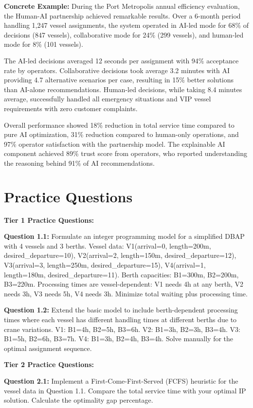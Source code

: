 \documentclass{article}
\begin{document}
\textbf{Concrete Example:} During the Port Metropolis annual efficiency evaluation, the Human-AI partnership achieved remarkable results. Over a 6-month period handling 1,247 vessel assignments, the system operated in AI-led mode for 68\% of decisions (847 vessels), collaborative mode for 24\% (299 vessels), and human-led mode for 8\% (101 vessels). 

The AI-led decisions averaged 12 seconds per assignment with 94\% acceptance rate by operators. Collaborative decisions took average 3.2 minutes with AI providing 4.7 alternative scenarios per case, resulting in 15\% better solutions than AI-alone recommendations. Human-led decisions, while taking 8.4 minutes average, successfully handled all emergency situations and VIP vessel requirements with zero customer complaints.

Overall performance showed 18\% reduction in total service time compared to pure AI optimization, 31\% reduction compared to human-only operations, and 97\% operator satisfaction with the partnership model. The explainable AI component achieved 89\% trust score from operators, who reported understanding the reasoning behind 91\% of AI recommendations.

\section{Practice Questions}

\textbf{Tier 1 Practice Questions:}

\textbf{Question 1.1:} Formulate an integer programming model for a simplified DBAP with 4 vessels and 3 berths. Vessel data: V1(arrival=0, length=200m, desired\_departure=10), V2(arrival=2, length=150m, desired\_departure=12), V3(arrival=3, length=250m, desired\_departure=15), V4(arrival=1, length=180m, desired\_departure=11). Berth capacities: B1=300m, B2=200m, B3=220m. Processing times are vessel-dependent: V1 needs 4h at any berth, V2 needs 3h, V3 needs 5h, V4 needs 3h. Minimize total waiting plus processing time.

\textbf{Question 1.2:} Extend the basic model to include berth-dependent processing times where each vessel has different handling times at different berths due to crane variations. V1: B1=4h, B2=5h, B3=6h. V2: B1=3h, B2=3h, B3=4h. V3: B1=5h, B2=6h, B3=7h. V4: B1=3h, B2=4h, B3=4h. Solve manually for the optimal assignment sequence.

\textbf{Tier 2 Practice Questions:}

\textbf{Question 2.1:} Implement a First-Come-First-Served (FCFS) heuristic for the vessel data in Question 1.1. Compare the total service time with your optimal IP solution. Calculate the optimality gap percentage.
\end{document}
